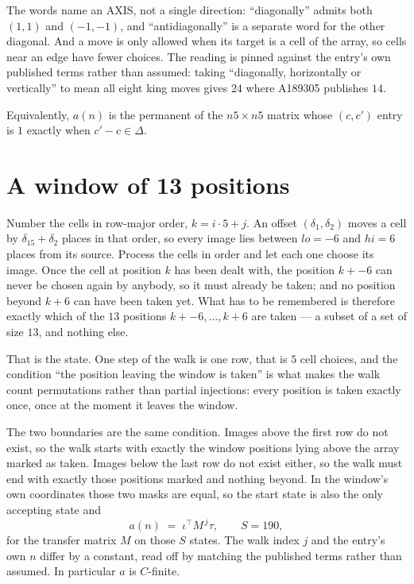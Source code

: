 \documentclass[11pt,a4paper]{article}
\theoremstyle{plain}
\theoremstyle{definition}
\begin{document}
The words name an AXIS, not a single direction: ``diagonally'' admits
both $(1,1)$ and $(-1,-1)$, and ``antidiagonally'' is a separate word for the other diagonal.
And a move is only allowed when its target is a cell of the array, so cells near an
edge have fewer choices. The reading is pinned against the entry's own published terms rather
than assumed: taking ``diagonally, horizontally or vertically'' to mean all eight king moves
gives $24$ where A189305 publishes $14$.

Equivalently, $a(n)$ is the permanent of the $n5\times n5$ matrix whose $(c,c')$ entry is
$1$ exactly when $c'-c\in\Delta$.

\section{A window of 13 positions}

Number the cells in row-major order, $k=i\cdot5+j$. An offset $(\delta_1,\delta_2)$ moves a
cell by $\delta_15+\delta_2$ places in that order, so every image lies between $lo=-6$ and
$hi=6$ places from its source. Process the cells in order and let each one choose its image.
Once the cell at position $k$ has been dealt with, the position $k+-6$ can never be chosen
again by anybody, so it must already be taken; and no position beyond $k+6$ can have been
taken yet. What has to be remembered is therefore exactly which of the $13$ positions
$k+-6,\dots,k+6$ are taken --- a subset of a set of size $13$, and nothing else.

That is the state. One step of the walk is one row, that is $5$ cell choices, and the
condition ``the position leaving the window is taken'' is what makes the walk count permutations
rather than partial injections: every position is taken exactly once, once at the moment it
leaves the window.

The two boundaries are the same condition. Images above the first row do not exist, so the walk
starts with exactly the window positions lying above the array marked as taken. Images below the
last row do not exist either, so the walk must end with exactly those positions marked and
nothing beyond. In the window's own coordinates those two masks are equal, so the start state is
also the only accepting state and
\[
a(n)\;=\;\iota^{\!\top}M^{\,j}\tau ,\qquad S=190,
\]
for the transfer matrix $M$ on those $S$ states. The walk index $j$ and the entry's own $n$
differ by a constant, read off by matching the published terms rather than assumed. In
particular $a$ is $C$-finite.
\end{document}
